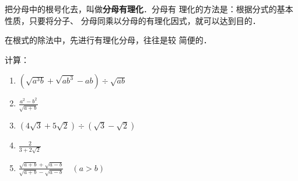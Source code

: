 把分母中的根号化去，叫做\textbf{分母有理化}．分母有
理化的方法是：根据分式的基本性质，只要将分子、
分母同乘以分母的有理化因式，就可以达到目的．

在根式的除法中，先进行有理化分母，往往是较
简便的．

\begin{example}
计算：
\begin{multicols}{2}
    \begin{enumerate}
        \item $\left(\sqrt{a^3b}+\sqrt{ab^3}-ab\right)\div \sqrt{ab}$
        \item $\frac{a^2-b^2}{\sqrt{a+b}}$
        \item $\left(4\sqrt{3}+5\sqrt{2}\right)\div \left(\sqrt{3}-\sqrt{2}\right)$
        \item $\frac{2}{3+2\sqrt{2}}$
        \item $\frac{\sqrt{a+b}+\sqrt{a-b}}{\sqrt{a+b}-\sqrt{a-b}}\quad (a>b)$
    \end{enumerate}   
\end{multicols}
\end{example}

